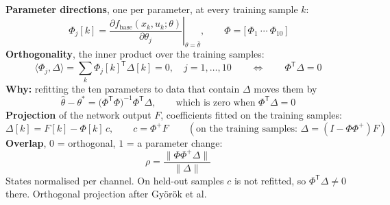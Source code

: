 \documentclass[border=10pt]{standalone}
\newcommand{\T}{\mathsf{T}}
\begin{document}
\begin{minipage}{17.5cm}
\large\color{cink}
\textbf{Parameter directions}, one per parameter, at every training sample $k$:
\[
  \Phi_j[k]=\left.\frac{\partial f_{\mathrm{base}}(x_k,u_k;\theta)}{\partial\theta_j}\right|_{\theta=\bar\theta},
  \qquad \Phi=\bigl[\,\Phi_1\ \cdots\ \Phi_{10}\,\bigr]
\]
\textbf{Orthogonality}, the inner product over the training samples:
\[
  \langle\Phi_j,\Delta\rangle=\sum_k \Phi_j[k]^{\T}\Delta[k]=0,\quad j=1,\dots,10
  \qquad\Longleftrightarrow\qquad \Phi^{\T}\Delta=0
\]
\textbf{Why:} refitting the ten parameters to data that contain $\Delta$ moves them by
\[
  \hat\theta-\theta^{*}=\bigl(\Phi^{\T}\Phi\bigr)^{-1}\Phi^{\T}\Delta,
  \qquad\text{which is zero when }\Phi^{\T}\Delta=0
\]
\textbf{Projection} of the network output $F$, coefficients fitted on the training samples:
\[
  \Delta[k]=F[k]-\Phi[k]\,c,\qquad c=\Phi^{+}F
  \qquad(\text{on the training samples: }\Delta=(I-\Phi\Phi^{+})F)
\]
\textbf{Overlap}, $0$ = orthogonal, $1$ = a parameter change:
\[
  \rho=\frac{\|\Phi\Phi^{+}\Delta\|}{\|\Delta\|}
\]
{\normalsize\color{cmuted} States normalised per channel. On held-out samples $c$ is not refitted,
so $\Phi^{\T}\Delta\neq0$ there. Orthogonal projection after Gy\"or\"ok et al.}
\end{minipage}
\end{document}
